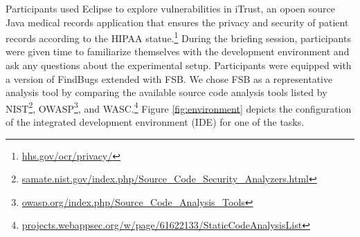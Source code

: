 \documentclass[conference]{IEEEtran}
\begin{document}
Participants used Eclipse to explore vulnerabilities in iTrust, an opoen source Java medical records application that ensures the privacy and security of patient records according to the HIPAA statue.\footnote{\url{hhs.gov/ocr/privacy/}} 
During the briefing session, participants were given time to familiarize themselves with the development environment and ask any questions about the experimental setup.
Participants were equipped with a version of FindBugs extended with FSB.
We chose FSB as a representative analysis tool by comparing the available source code analysis tools listed by NIST\footnote{\url{samate.nist.gov/index.php/Source_Code_Security_Analyzers.html}}, OWASP\footnote{\url{owasp.org/index.php/Source_Code_Analysis_Tools}}, and WASC.\footnote{\url{projects.webappsec.org/w/page/61622133/StaticCodeAnalysisList}}
Figure \ref{fig:environment} depicts the configuration of the integrated development environment (IDE) for one of the tasks.
\end{document}
